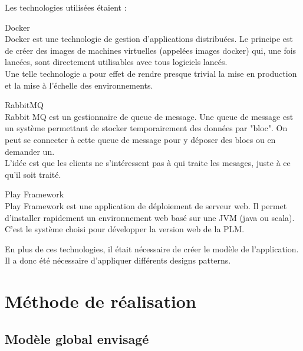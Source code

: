 \documentclass[stage]{tnreport}
\begin{document}
Les technologies utilisées étaient :
\begin{description}
	\item{Docker} \hfill \\
		Docker est une technologie de gestion d'applications distribuées. Le principe est de créer des images de machines virtuelles (appelées images docker) qui, une fois lancées, sont directement utilisables avec tous logiciels lancés. \\
		Une telle technologie a pour effet de rendre presque trivial la mise en production et la mise à l'échelle des environnements.
	\item{RabbitMQ} \hfill \\
		Rabbit MQ est un gestionnaire de queue de message. Une queue de message est un  système permettant de stocker temporairement des données par "bloc". On peut se connecter à cette queue de message pour y déposer des blocs ou en demander un. \\
		L'idée est que les clients ne s'intéressent pas à qui traite les mesages, juste à ce qu'il soit traité.
	\item{Play Framework} \hfill \\
		Play Framework est une application de déploiement de serveur web. Il permet d'installer rapidement un environnement web basé sur une JVM (java ou scala). C'est le système choisi pour développer la version web de la PLM.
\end{description}

En plus de ces technologies, il était nécessaire de créer le modèle de l'application. Il a donc été nécessaire d'appliquer différents designs patterns.

\section{Méthode de réalisation}

\subsection{Modèle global envisagé}
\end{document}
